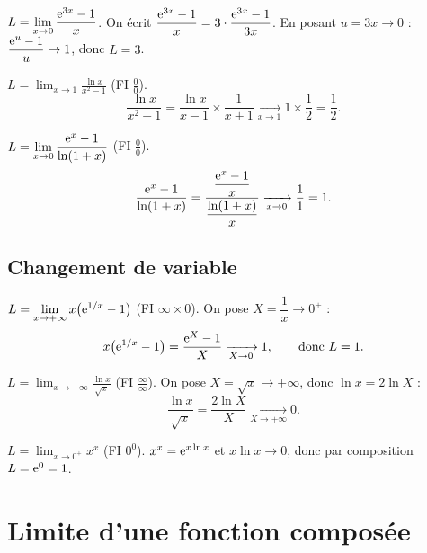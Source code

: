 \begin{exemple}
	$\displaystyle L=\lim_{x\to 0}\frac{\mathrm{e}^{3x}-1}{x}$.
	On écrit
	$\dfrac{\mathrm{e}^{3x}-1}{x}=3\cdot\dfrac{\mathrm{e}^{3x}-1}{3x}$.
	En posant $u=3x\to 0$ : $\dfrac{\mathrm{e}^{u}-1}{u}\to 1$, donc $L=3$.
\end{exemple}

\begin{exemple}
	$\displaystyle L=\lim_{x\to 1}\frac{\ln x}{x^2-1}$ (FI $\frac{0}{0}$).
	\[
	\frac{\ln x}{x^2-1}
	=\frac{\ln x}{x-1}\times\frac{1}{x+1}
	\xrightarrow[x\to 1]{}1\times\frac{1}{2}=\frac{1}{2}.
	\]
\end{exemple}

\begin{exemple}
	$\displaystyle L=\lim_{x\to 0}\frac{\mathrm{e}^x-1}{\ln(1+x)}$ (FI $\frac{0}{0}$).
	\[
	\frac{\mathrm{e}^x-1}{\ln(1+x)}
	=\frac{\dfrac{\mathrm{e}^x-1}{x}}{\dfrac{\ln(1+x)}{x}}
	\xrightarrow[x\to 0]{}\frac{1}{1}=1 .
	\]
\end{exemple}

\subsection{Changement de variable}

\begin{exemple}
	$\displaystyle L=\lim_{x\to+\infty}x\bigl(\mathrm{e}^{1/x}-1\bigr)$ (FI $\infty\times 0$).
	On pose $X=\dfrac{1}{x}\to 0^+$ :
	\[
	x\bigl(\mathrm{e}^{1/x}-1\bigr)=\frac{\mathrm{e}^{X}-1}{X}\xrightarrow[X\to 0]{}1,
	\qquad\text{donc } L=1 .
	\]
\end{exemple}

\begin{exemple}
	$\displaystyle L=\lim_{x\to+\infty}\frac{\ln x}{\sqrt{x}}$ (FI $\frac{\infty}{\infty}$).
	On pose $X=\sqrt{x}\to+\infty$, donc $\ln x=2\ln X$ :
	\[
	\frac{\ln x}{\sqrt{x}}=\frac{2\ln X}{X}\xrightarrow[X\to+\infty]{}0 .
	\]
\end{exemple}

\begin{exemple}
	$\displaystyle L=\lim_{x\to 0^+}x^{x}$ (FI $0^0$).
	$x^{x}=\mathrm{e}^{x\ln x}$ et $x\ln x\to 0$, donc par composition $L=\mathrm{e}^{0}=1$.
\end{exemple}


\section{Limite d'une fonction composée}

